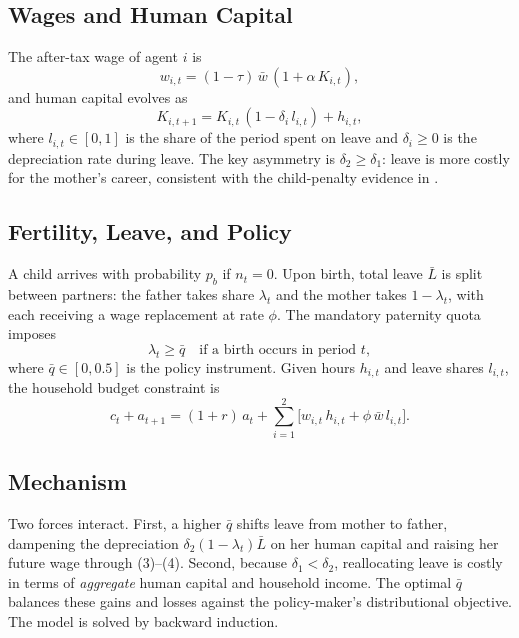 \subsection*{Wages and Human Capital}

The after-tax wage of agent $i$ is
\begin{equation}
    w_{i,t} = (1-\tau)\,\bar{w}\,(1 + \alpha\, K_{i,t}),
\end{equation}
and human capital evolves as
\begin{equation}
    K_{i,t+1} = K_{i,t}\,(1 - \delta_i\, l_{i,t}) + h_{i,t},
\end{equation}
where $l_{i,t} \in [0,1]$ is the share of the period spent on leave and $\delta_i \geq 0$ is the depreciation rate during leave. The key asymmetry is $\delta_2 \geq \delta_1$: leave is more costly for the mother's career, consistent with the child-penalty evidence in \citet{kleven2019children}.

\subsection*{Fertility, Leave, and Policy}

A child arrives with probability $p_b$ if $n_t = 0$. Upon birth, total leave $\bar{L}$ is split between partners: the father takes share $\lambda_t$ and the mother takes $1-\lambda_t$, with each receiving a wage replacement at rate $\phi$. The mandatory paternity quota imposes
\begin{equation}
    \lambda_t \geq \bar{q}\quad\text{if a birth occurs in period }t,
\end{equation}
where $\bar{q} \in [0, 0.5]$ is the policy instrument. Given hours $h_{i,t}$ and leave shares $l_{i,t}$, the household budget constraint is
\begin{equation}
    c_t + a_{t+1} = (1+r)\,a_t + \sum_{i=1}^{2}\bigl[w_{i,t}\,h_{i,t} + \phi\,\bar{w}\,l_{i,t}\bigr].
\end{equation}

\subsection*{Mechanism}

Two forces interact. First, a higher $\bar{q}$ shifts leave from mother to father, dampening the depreciation $\delta_2 (1-\lambda_t)\bar{L}$ on her human capital and raising her future wage through (3)–(4). Second, because $\delta_1 < \delta_2$, reallocating leave is costly in terms of \emph{aggregate} human capital and household income. The optimal $\bar{q}$ balances these gains and losses against the policy-maker's distributional objective. The model is solved by backward induction.

